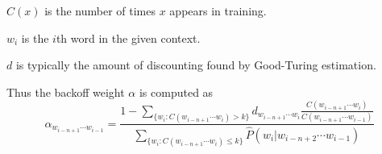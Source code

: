 $C(x)$ is the number of times $x$ appears in training.

$w_{i}$ is the $i$th word in the given context.

$d$ is typically the amount of discounting found by Good-Turing estimation.

Thus the backoff weight $\alpha$ is computed as
$$
\alpha_{w_{i-n+1}\cdots{}w_{i-1}} = \frac{1-\sum\limits_{\{w_{i}:C(w_{i-n+1}\cdots{}w_{i})>k\}}d_{w_{i-n+1}\cdots{}w_{i}}\frac{C(w_{i-n+1}\cdots{}w_{i})}{C(w_{i-n+1}\cdots{}w_{i-1})}}{\sum\limits_{\{w_{i}:C(w_{i-n+1}\cdots{}w_{i})\leq{k}\}}\hat{P}(w_{i}|w_{i-n+2}\cdots{}w_{i-1})}
$$